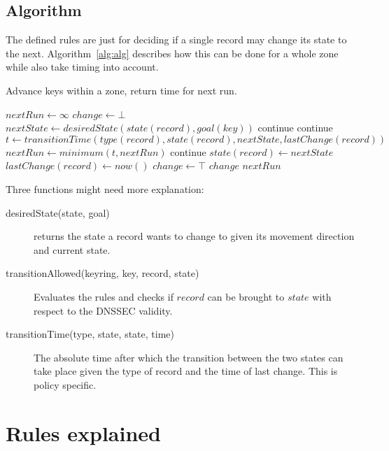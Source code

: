 \documentclass[twoside, a4paper]{article}
\begin{document}
\subsection{Algorithm}

The defined rules are just for deciding if a single record may change its
state to the next. Algorithm~\ref{alg:alg} describes how this can be 
done for a whole zone while also take timing into account. 

\begin{algorithm}
\caption{Advance keys within a zone, return time for next run.}
\label{alg:alg}
\begin{algorithmic}
\STATE $nextRun \gets \infty$
\REPEAT
\STATE $change \gets \bot$ 
\STATE $nextState \gets desiredState(state(record), goal(key))$
\STATE {}
\STATE continue
\ENDIF
{}
\STATE {}
\STATE continue
\ENDIF
\STATE $t \gets transitionTime(type(record), state(record), nextState, lastChange(record))$
\STATE {}
\STATE $nextRun \gets minimum(t, nextRun)$
\STATE continue
\ENDIF
\STATE $state(record) \gets nextState$
\STATE $lastChange(record) \gets now()$
\STATE $change \gets \top$
\ENDFOR
\ENDFOR
\UNTIL \NOT $change$
\RETURN $nextRun$
\end{algorithmic}
\end{algorithm}

Three functions might need more explanation:
\begin{description}
\item[desiredState(state, goal)]	returns the state a record 
wants to change to given its movement direction and current state.
\item[transitionAllowed(keyring, key, record, state)]	Evaluates the
rules and checks if $record$ can be brought to $state$ with respect
to the DNSSEC validity.
\item[transitionTime(type, state, state, time)]	The absolute time after
which the transition between the two states can take place given the 
type of record and the time of last change. This is policy specific.
\end{description}

\section{Rules explained}
\end{document}
